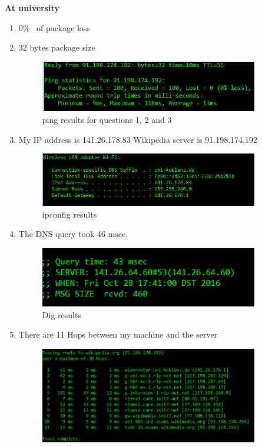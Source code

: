 \documentclass{WeSTassignment}
\begin{document}
\textbf{At university}
\begin{enumerate}
\itemsep0em
\item  0\% \ of package loss\
\item 32 bytes package size \\
\begin{figure}[h]
  \centering
  \includegraphics[width=0.9\textwidth]{ping.png}
   \caption{ping results for questions 1, 2 and 3}
     \label{fig:ping}
\end{figure}
\item My IP address is 141.26.178.83 Wikipedia server is 91.198.174.192 \\
\begin{figure}[!ht]
  \centering
  \includegraphics[width=0.9\textwidth]{my_ip.png}
   \caption{ipconfig results}
     \label{fig:ipconfig}
\end{figure}
\item The DNS query took 46 msec.\\
\begin{figure}[!ht]
  \centering
  \includegraphics[width=0.9\textwidth]{dig.png}
   \caption{Dig results}
     \label{fig:dig}
\end{figure}
\item There are 11 Hops between my machine and the server \\
\begin{figure}[!ht]
  \centering
  \includegraphics[width=0.9\textwidth]{tracert.png}

\end{figure}
\end{enumerate}
\end{document}
